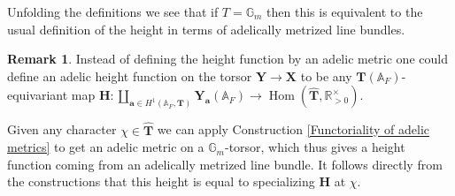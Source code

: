 \documentclass[a4paper,11pt,reqno]{amsart}
\newcommand{\R}{\mathbb{R}}
\newcommand{\G}{\mathbb{G}}
\newcommand{\A}{\mathbb{A}}
\DeclareMathOperator{\Hom}{Hom}
\theoremstyle{definition}
\newtheorem{remark}[theorem]{Remark}
\begin{document}
Unfolding the definitions we see that if $T = \G_m$ then this is equivalent to the usual definition of the height \cite[\S2.2.6]{Chambert-Loir2010Igusa} in terms of adelically metrized line bundles. 

\begin{remark}	
	 Instead of defining the height function by an adelic metric one could define an adelic height function on the torsor $\mathbf{Y} \to \mathbf{X}$ to be any $\mathbf{T}(\A_F)$-equivariant map $\mathbf{H}: \coprod_{\mathbf{a} \in H^1(\A_F, \mathbf{T})} \mathbf{Y}_{\mathbf{a}}(\A_F) \to \Hom(\hat{\mathbf{T}}, \R_{>0}^{\times})$.
\end{remark}

Given any character $\chi \in \hat{\mathbf{T}}$ we can apply Construction \ref{Functoriality of adelic metrics} to get an adelic metric on a $\G_m$-torsor, which thus gives a height function coming from an adelically metrized line bundle. It follows directly from the constructions that this height is equal to specializing $\mathbf{H}$ at $\chi$.
\end{document}
